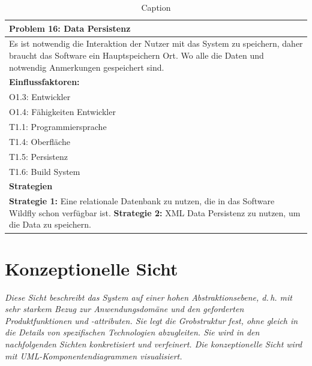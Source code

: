 \documentclass[enabledeprecatedfontcommands,fontsize=12pt,paper=a4,twoside]{scrartcl}
\begin{document}
\begin{table}[H]
    \centering
    \begin{tabular}{|p{15cm}|}
    \hline
          \textbf{Problem 16:} Data Persistenz 
          \\ \hline
          Es ist notwendig die Interaktion der Nutzer mit das System zu speichern, daher braucht das Software ein Hauptspeichern Ort. Wo alle die Daten und notwendig Anmerkungen gespeichert sind.
          \\ \hline
          \textbf{Einflussfaktoren: } \\
          O1.3: Entwickler \\
          O1.4: Fähigkeiten Entwickler \\
          T1.1: Programmiersprache \\
          T1.4: Oberfläche \\
          T1.5: Persistenz \\
          T1.6: Build System\\
          \hline
          \textbf{Strategien} \\ \hline
          \textbf{Strategie 1:} Eine relationale Datenbank zu nutzen, die in das Software Wildfly schon verfügbar ist.
          \textbf{Strategie 2:} XML Data Persistenz zu nutzen, um die Data  zu speichern. 
          \\ \hline
    \end{tabular}
    \caption{Caption}
    \label{tab:my_label}
\end{table}



\section{Konzeptionelle Sicht}
\label{sec:konzeptionell}

{\it Diese Sicht beschreibt das System auf einer hohen Abstraktionsebene,
d.\,h. mit sehr starkem Bezug zur Anwendungsdomäne und den geforderten
Produktfunktionen und \linebreak-attributen. Sie legt die Grobstruktur fest,
ohne gleich in die Details von spezifischen Technologien abzugleiten.
Sie wird in den nachfolgenden Sichten konkretisiert und verfeinert. Die
konzeptionelle Sicht wird mit {UML}-Komponentendiagrammen visualisiert.}
\end{document}
